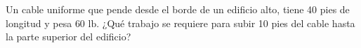 \item Un cable uniforme que pende desde el borde de un edificio alto, tiene 40 pies de longitud y pesa $60 \text{ lb}$. ¿Qué trabajo se requiere para subir 10 pies del cable hasta la parte superior del edificio?

